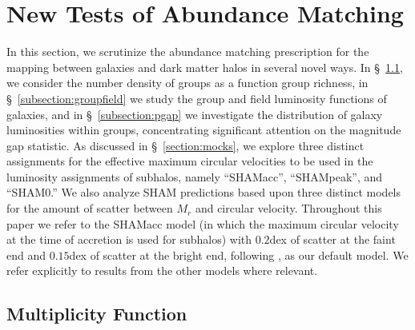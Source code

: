 \documentclass[usenatbib,usegraphicx,letterpaper]{mn2e}
\begin{document}
%
\section{New Tests of Abundance Matching}
\label{section:prediction}

In this section, we scrutinize the abundance matching prescription 
for the mapping between galaxies and dark matter halos in several novel ways.  
In \S~\ref{subsection:gn}, we consider the number density of groups 
as a function group richness, in \S~\ref{subsection:groupfield} we 
study the group and field luminosity functions of galaxies, and in 
\S~\ref{subsection:pgap} we investigate the distribution of galaxy 
luminosities within groups, concentrating significant attention on 
the magnitude gap statistic. As discussed in \S~\ref{section:mocks}, 
we explore three distinct assignments for the effective maximum 
circular velocities to be used in the luminosity assignments of 
subhalos, namely ``SHAMacc'', ``SHAMpeak'', and ``SHAM0.''  
We also analyze SHAM predictions based upon three distinct models for 
the amount of scatter between $M_r$ and circular velocity.  
Throughout this paper we refer to the SHAMacc model (in which the 
maximum circular velocity at the time of accretion is used for subhalos) 
with $0.2$dex of scatter at the faint end and $0.15$dex of 
scatter at the bright end, following \citet{trujillo-gomez_etal11}, 
as our default model.  We refer explicitly to results from the other 
models where relevant.


\subsection{Multiplicity Function}
\label{subsection:gn}
\end{document}
